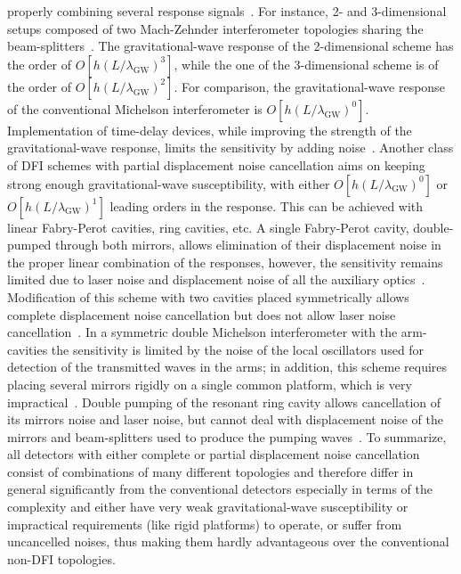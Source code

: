 properly combining several response signals~\cite{2006_DTNF_GW_detection}. For instance, 2- and 3-dimensional
setups composed of two Mach-Zehnder interferometer topologies
sharing the beam-splitters~\cite{2006_interferometers_DNF_GW_detection}. The
gravitational-wave response of the 2-dimensional scheme has the
order of $O[h(L/\lambda_{\textrm{GW}})^3]$, while the one of the
3-dimensional scheme is of the order of
$O[h(L/\lambda_{\textrm{GW}})^2]$. For comparison, the
gravitational-wave response of the conventional Michelson
interferometer is $O[h(L/\lambda_{\textrm{GW}})^0]$.
Implementation of time-delay devices, while improving the
strength of the gravitational-wave response, limits the
sensitivity by adding noise~\cite{2007_time_delay}. Another
class of DFI schemes with partial displacement noise cancellation
aims on keeping strong enough gravitational-wave susceptibility,
with either $O[h(L/\lambda_{\textrm{GW}})^0]$ or
$O[h(L/\lambda_{\textrm{GW}})^1]$ leading orders in the response.
This can be achieved with linear Fabry-Perot cavities, ring
cavities, etc. A single Fabry-Perot cavity, double-pumped through
both mirrors, allows elimination of their displacement noise in
the proper linear combination of the responses, however, the
sensitivity remains limited due to laser noise and displacement
noise of all the auxiliary optics~\cite{2008_DFI_FP_toy_model}.
Modification of this scheme with two cavities placed symmetrically
allows complete displacement noise cancellation but does not allow
laser noise cancellation~\cite{2008_DFI_2FP}. In a symmetric
double Michelson interferometer with the arm-cavities the
sensitivity is limited by the noise of the local oscillators used
for detection of the transmitted waves in the arms; in addition,
this scheme requires placing several mirrors rigidly on a single common
platform, which is very impractical~\cite{2009_DFI_MFP}.
Double pumping of the resonant ring cavity allows cancellation of
its mirrors noise and laser noise, but cannot deal with
displacement noise of the mirrors and beam-splitters used to
produce the pumping waves~\cite{2008_resonant_speedmeter_DFI}. To
summarize, all detectors with either complete or partial
displacement noise cancellation consist of combinations of many
different topologies and therefore differ in general significantly
from the conventional detectors especially in terms of the
complexity and either have very weak gravitational-wave
susceptibility or impractical requirements (like rigid platforms)
to operate, or suffer from uncancelled noises, thus making them
hardly advantageous over the conventional non-DFI topologies.
